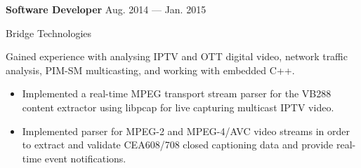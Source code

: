 \parbox[t][][t]{\linewidth}{
	\parbox{\linewidth}{\textbf{Software Developer}
		\hfill {{Aug. 2014 --- Jan. 2015}}}
		\smallbreak
	\parbox{\linewidth}{Bridge Technologies}

	\bigskip

	Gained experience with analysing IPTV and OTT digital video, network traffic analysis,
	PIM-SM multicasting, and working with embedded C++.

	\bigskip
	\begin{itemize}
		\item{Implemented a real-time MPEG transport stream parser for the VB288 content extractor using libpcap for live capturing
			multicast IPTV video.}\\[-.6em]
		\item{Implemented parser for MPEG-2 and MPEG-4/AVC video streams in order to extract and
			validate CEA608/708 closed captioning data and provide real-time event notifications.}

	\end{itemize}
	\bigskip
	\bigskip
}


